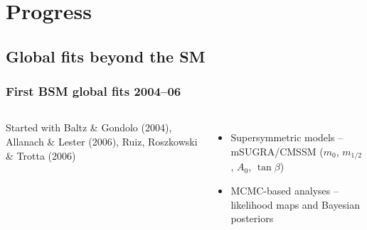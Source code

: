 \documentclass[xcolor=dvipsnames]{beamer}
\begin{document}
\section{Progress}

\subsection{Global fits beyond the SM}

\begin{frame}
\frametitle{First BSM global fits 2004--06}

\begin{columns}

Started with Baltz \& Gondolo (2004), Allanach \& Lester (2006), Ruiz, Roszkowski \& Trotta (2006)
{\footnotesize
\begin{itemize}
  \item Supersymmetric models -- mSUGRA/CMSSM ($m_0$, $m_{1/2}$, $A_0$, $\tan\beta$)
  \item MCMC-based analyses -- likelihood maps and Bayesian posteriors
\end{itemize}}

\end{columns}


\end{frame}
\end{document}
